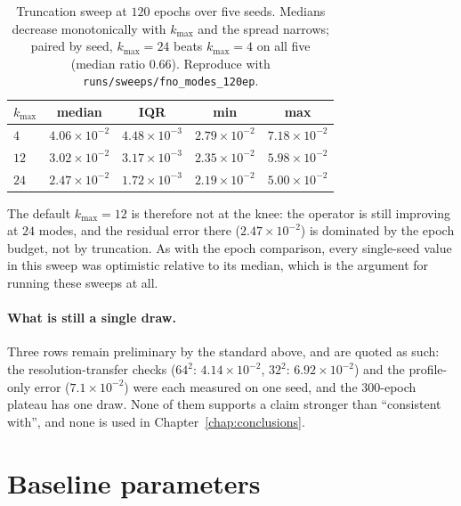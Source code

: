 \documentclass[11pt]{article}
\begin{document}
\begin{table}[h]
\centering
\begin{tabular}{lcccc}
\toprule
$k_{\max}$ & median & IQR & min & max \\
\midrule
$4$  & $4.06\times10^{-2}$ & $4.48\times10^{-3}$ & $2.79\times10^{-2}$ & $7.18\times10^{-2}$ \\
$12$ & $3.02\times10^{-2}$ & $3.17\times10^{-3}$ & $2.35\times10^{-2}$ & $5.98\times10^{-2}$ \\
$24$ & $2.47\times10^{-2}$ & $1.72\times10^{-3}$ & $2.19\times10^{-2}$ & $5.00\times10^{-2}$ \\
\bottomrule
\end{tabular}
\caption{Truncation sweep at $120$ epochs over five seeds. Medians decrease
monotonically with $k_{\max}$ and the spread narrows; paired by seed, $k_{\max}=24$
beats $k_{\max}=4$ on all five (median ratio $0.66$). Reproduce with
\texttt{runs/sweeps/fno\_modes\_120ep}.}
\label{tab:fno-modes}
\end{table}

The default $k_{\max}=12$ is therefore not at the knee: the operator is still
improving at $24$ modes, and the residual error there
($2.47\times10^{-2}$) is dominated by the epoch budget, not by truncation. As
with the epoch comparison, every single-seed value in this sweep was optimistic
relative to its median, which is the argument for running these sweeps at all.

\paragraph{What is still a single draw.}
Three rows remain preliminary by the standard above, and are quoted as such:
the resolution-transfer checks ($64^{2}$: $4.14\times10^{-2}$,
$32^{2}$: $6.92\times10^{-2}$) and the profile-only error
($7.1\times10^{-2}$) were each measured on one seed, and the
$300$-epoch plateau has one draw. None of them supports a claim stronger than
``consistent with'', and none is used in Chapter~\ref{chap:conclusions}.

\section{Baseline parameters}
\label{sec:params}
\end{document}
